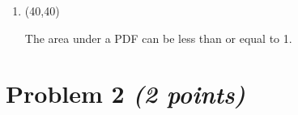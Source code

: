 \documentclass[11pt,twoside]{article}
\numberwithin{equation}{section}
\newcommand{\?}{\stackrel{?}{=}}
\newcommand{\gr}{\color{green!40!black}}
\begin{document}
\begin{enumerate}[\bf (i)]
  
  \item \hfill
    \begin{minipage}{.1\linewidth}
      \framebox(40,40){\gr  }
    \end{minipage}\quad
    \begin{minipage}{.85\linewidth}
      The area under a PDF can be less than or equal to 1.
     \end{minipage}
  
  \smallskip
  



\end{enumerate}

  

\eject  

\section*{Problem 2 \textit{(2 points)}}

\end{document}
